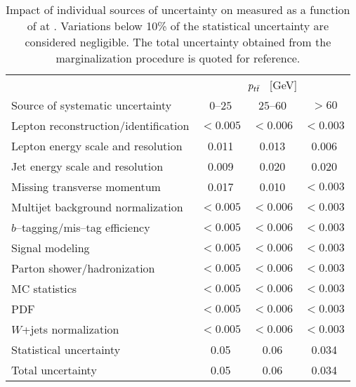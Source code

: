 \begin{table}[!htbp]\centering
\begin{tabular}{l c c c}
\toprule
 &\multicolumn{3}{c}{$p_{t\bar{t}}{}$ ~[GeV]} \\
Source of systematic uncertainty           &    $0$--$25$           &        $25$--$60$         &  $>60$    \\
\midrule
Lepton reconstruction/identification              & $<0.005$ & $<0.006$ & $<0.003$ \\
Lepton energy scale and resolution                & 0.011 & 0.013 & 0.006   \\
Jet energy scale and resolution                   & 0.009 & 0.020 & 0.020   \\
Missing transverse momentum & 0.017 & 0.010 & $<0.003$ \\
Multijet background normalization    & $<0.005$ & $<0.006$ & $<0.003$  \\
$b$--tagging/mis--tag efficiency                & $<0.005$ & $<0.006$ & $<0.003$  \\
Signal modeling                        & $<0.005$ & $<0.006$ & $<0.003$  \\
Parton shower/hadronization             & $<0.005$ & $<0.006$ & $<0.003$  \\
MC statistics                 & $<0.005$ & $<0.006$ & $<0.003$  \\
PDF                                     & $<0.005$ & $<0.006$ & $<0.003$  \\
$W$+jets normalization        & $<0.005$ & $<0.006$ & $<0.003$  \\
\midrule
Statistical uncertainty                 & 0.05   &        0.06      &
0.034     \\
\midrule
Total uncertainty                 & 0.05   &        0.06      &        0.034     \\
\bottomrule
\end{tabular}
\caption{Impact of individual sources of uncertainty on
  \ac{} measured as a function of \pttt{} at \seventev{}. Variations below 10\%
  of the statistical uncertainty are considered negligible. The total uncertainty obtained from the
  marginalization procedure is quoted for reference.}
\label{table:Systematics_pttt}
\end{table}

